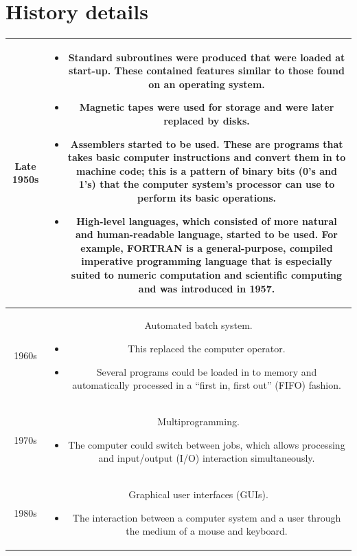 \documentclass[a4paper]{systems-software}
\begin{document}
\section*{History details}

\begin{longtable}{|c|c|}
	\hline
	Late 1950s &
	\begin{minipage}[t]{0.8\textwidth}
    	\begin{itemize}
		    \item Standard subroutines were produced that were loaded at start-up. These contained features similar to those found on an operating system.
	  		\item Magnetic tapes were used for storage and were later replaced by disks.
	  		\item Assemblers started to be used. These are programs that takes basic computer instructions and convert them in to machine code; this is a pattern of binary bits (0’s and 1’s) that the computer system's processor can use to perform its basic operations.
	  		\item High-level languages, which consisted of more natural and human-readable language, started to be used. For example, FORTRAN is a general-purpose, compiled imperative programming language that is especially suited to numeric computation and scientific computing and was introduced in 1957.
    	\end{itemize}
  	\end{minipage}
	\\ \hline
	1960s &
	\begin{minipage}[t]{0.8\textwidth}
	  	Automated batch system.
	    \begin{itemize}
		    \item This replaced the computer operator.
		    \item Several programs could be loaded in to memory and automatically processed in a “first in, first out” (FIFO) fashion.
    	\end{itemize}
	\end{minipage}
	\\ \hline
	1970s &
	\begin{minipage}[t]{0.8\textwidth}
	  	Multiprogramming.
	    \begin{itemize}
		    \item The computer could switch between jobs, which allows processing and input/output (I/O) interaction simultaneously.
    	\end{itemize}
	\end{minipage}
	\\ \hline
	1980s &
	\begin{minipage}[t]{0.8\textwidth}
	  	Graphical user interfaces (GUIs).
	    \begin{itemize}
		    \item The interaction between a computer system and a user through the medium of a mouse and keyboard.
    	\end{itemize}
	\end{minipage}
	\\ \hline
\end{longtable}
\end{document}
